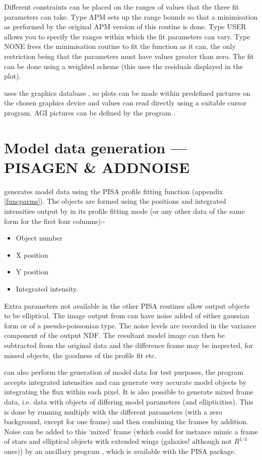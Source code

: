 Different constraints can be placed on the ranges of values that the
three fit parameters can take. Type APM sets up the range bounds so
that a minimisation as performed by the original APM version of this
routine is done. Type USER allows you to specify the ranges within
which the fit parameters can vary.  Type NONE frees the minimisation
routine to fit the function as it can, the only restriction being that
the parameters must have values greater than zero.  The fit can be
done using a weighted scheme (this uses the residuals displayed in the
plot).

 uses the graphics database , so
plots can be made within predefined pictures on the chosen graphics
device and values can read directly using a suitable cursor
program. AGI pictures can be defined by the program .

\section{Model data generation --- PISAGEN \& ADDNOISE}

 generates model data using the PISA profile fitting function
(appendix \ref{funcparms}). The objects are formed using the positions
and integrated intensities output by  in its profile
fitting mode (or any other data of the same form for the first four
columns):-
\begin{itemize}
\item Object number
\item X position
\item Y position
\item Integrated intensity.
\end{itemize}
Extra parameters not available in the other PISA routines allow 
output objects to be elliptical. The image output from  can have
noise added of either gaussian form or of a pseudo-poissonian type. The
noise levels are recorded in the variance component of the output NDF.
The resultant model image can then be subtracted from the original data
and the difference frame may be inspected, for missed objects, the
goodness of the profile fit etc.

 can also perform the generation of model data for test purposes,
the program accepts integrated intensities and can generate very
accurate model objects by integrating the flux within each pixel. It is
also possible to generate mixed frame data, i.e. data with objects of
differing model parameters (and ellipticities). This is done by running
 multiply with the different parameters (with a zero background,
except for one frame) and then combining the frames by addition. Noise
can be added to this `mixed' frame (which could for instance mimic a
frame of stars and elliptical objects with extended wings (galaxies!
although not $R^{1/4}$ ones)) by an ancillary program , which is
available with the PISA package.

